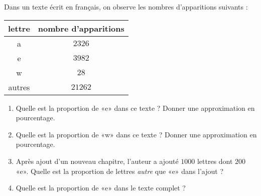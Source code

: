 
\begin{exercice}\label{exo2smath-0312}

    Dans un texte écrit en français, on observe les nombres d'apparitions suivants :
    \begin{center}
    \begin{tabular}[]{|c||c|}
        \hline
        lettre&nombre d'apparitions\\
        \hline\hline
        a&$2326$\\
        \hline
        e&$3982$\\
        \hline
        w&$28$\\
        \hline
        autres&$21262$\\
        \hline
    \end{tabular}
    \end{center}
    \begin{enumerate}
        \item
            Quelle est la proportion de «e» dans ce texte ? Donner une approximation en pourcentage.
        \item
            Quelle est la proportion de «w» dans ce texte ? Donner une approximation en pourcentage.
        \item
            Après ajout d'un nouveau chapitre, l'auteur a ajouté \( 1000\) lettres dont \( 200\) «e». Quelle est la proportion de lettres \emph{autre} que «e»  dans l'ajout ?
        \item
            Quelle est la proportion de «e» dans le texte complet ?
    \end{enumerate}

\end{exercice}
